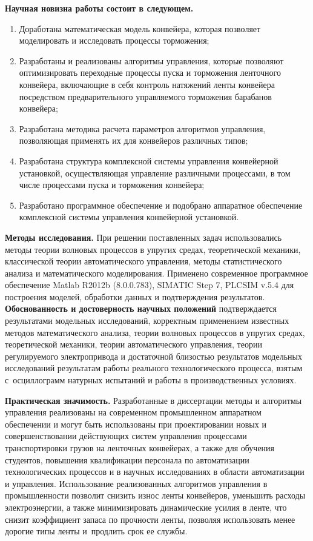 \textbf{Научная новизна работы состоит в следующем.}
\begin{enumerate}
  \item Доработана математическая модель конвейера, которая позволяет моделировать и исследовать процессы торможения;
  \item Разработаны и реализованы алгоритмы управления, которые позволяют оптимизировать переходные процессы пуска и торможения ленточного конвейера, включающие в себя контроль натяжений ленты конвейера посредством предварительного управляемого торможения барабанов конвейера;
  \item Разработана методика расчета параметров алгоритмов управления, позволяющая применять их для конвейеров различных типов;
  \item Разработана структура комплексной системы управления конвейерной установкой, осуществляющая управление различными процессами, в том числе процессами пуска и торможения конвейера;
  \item Разработано программное обеспечение и подобрано аппаратное обеспечение комплексной системы управления конвейерной установкой.
\end{enumerate}

\bigskip
\textbf{Методы исследования.} При решении поставленных задач использовались методы теории волновых процессов в упругих средах, теоретической механики, классической теории автоматического управления, методы статистического анализа и математического моделирования. Применено современное программное обеспечение Matlab R2012b (8.0.0.783), SIMATIC Step 7, PLCSIM v.5.4 для построения моделей, обработки данных и подтверждения результатов.\\

\textbf{Обоснованность и достоверность научных положений} подтверждается результатами модельных исследований, корректным применением известных методов математического анализа, теории волновых процессов в упругих средах, теоретической механики, теории автоматического управления, теории регулируемого электропривода и достаточной близостью результатов модельных исследований результатам работы реального технологического процесса, взятым с~осциллограмм натурных испытаний и работы в производственных условиях.
\bigskip

\textbf{Практическая значимость.} Разработанные в диссертации методы и алгоритмы управления реализованы на современном промышленном аппаратном обеспечении и могут быть использованы при проектировании новых и совершенствовании действующих систем управления процессами транспортировки грузов на ленточных конвейерах, а также для обучения студентов, повышения квалификации персонала по автоматизации технологических процессов и в научных исследованиях в области автоматизации и управления. Использование реализованных алгоритмов управления в промышленности позволит снизить износ ленты конвейеров, уменьшить расходы электроэнергии, а также минимизировать динамические усилия в ленте, что снизит коэффициент запаса по прочности ленты, позволяя использовать менее дорогие типы ленты и~продлить срок ее службы.
\bigskip

